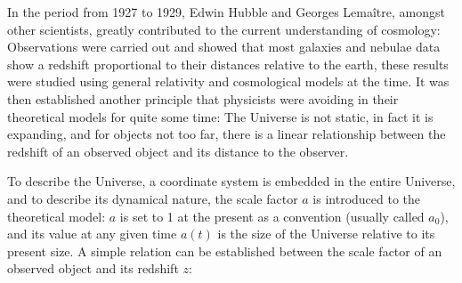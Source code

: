 \documentclass[openany,a4paper,12pt,oneside]{book}
\begin{document}
\begin{spacing}{1.5}



In the period from 1927 to 1929, Edwin Hubble and Georges Lemaître, amongst other scientists, greatly contributed to the current understanding of cosmology: Observations were carried out and showed that most galaxies and nebulae data show a redshift proportional to their distances relative to the earth\cite{hubble}, these results were studied using general relativity and cosmological models at the time\cite{Lemaitre:1927zz}. It was then established another principle that physicists were avoiding in their theoretical models for quite some time: The Universe is not static, in fact it is expanding, and for objects not too far, there is a linear relationship between the redshift of an observed object and its distance to the observer. 

To describe the Universe, a coordinate system is embedded in the entire Universe, and to describe its dynamical nature, the scale factor $a$ is introduced to the theoretical model: $a$ is set to 1 at the present as a convention (usually called $a_0$), and its value at any given time $a(t)$ is the size of the Universe relative to its present size. A simple relation can be established between the scale factor of an observed object and its redshift $z$:


\end{spacing}
\end{document}
